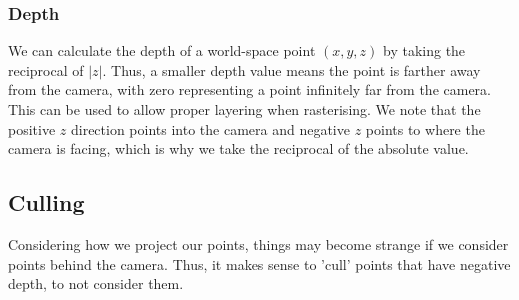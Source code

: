 \subsubsection{Depth}

We can calculate the depth of a world-space point $(x, y, z)$ by taking the reciprocal
of $|z|$. Thus, a smaller depth value means the point is farther away from the 
camera, with zero representing a point infinitely far from the camera.
This can be used to allow proper layering when rasterising.
We note that the positive $z$ direction points into the camera and negative
$z$ points to where the camera is facing, which is why we take the reciprocal
of the absolute value.

\subsection{Culling}

Considering how we project our points, things may become strange if we consider
points behind the camera. Thus, it makes sense to 'cull' points that have negative
depth, to not consider them.
